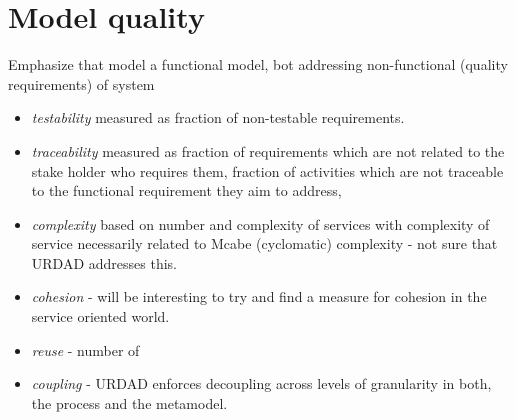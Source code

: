 \section{Model quality}

Emphasize that model a functional model, bot addressing non-functional (quality requirements) of system

\begin{itemize}
  \item \emph{testability} measured as fraction of non-testable requirements.
  \item \emph{traceability} measured as fraction of requirements which are not related to the stake holder who requires them, fraction of activities which are not traceable to the functional requirement they aim to address, 
  \item \emph{complexity} based on number and complexity of services with complexity of service necessarily related to Mcabe (cyclomatic) complexity - not sure that URDAD addresses this.
  \item \emph{cohesion} - will be interesting to try and find a measure for cohesion in the service oriented world.
  \item \emph{reuse} - number of
  \item \emph{coupling} - URDAD enforces decoupling across levels of granularity in both, the process and the metamodel.
\end{itemize}
